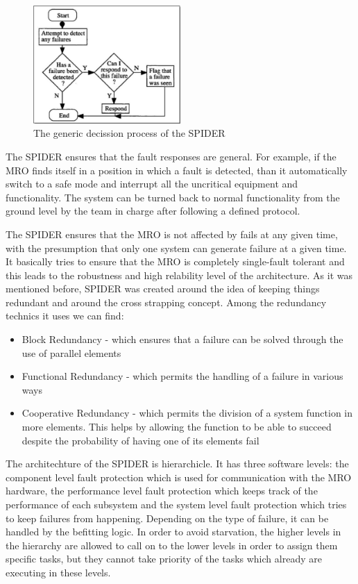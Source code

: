 \begin{figure}[htb]
	\begin{center}
	\includegraphics[width=0.5\textwidth]{img/spider.png}
	\caption{The generic decission process of the SPIDER\cite{surv-nasa-mars}}
	\label{fig:spider}
	\end{center}
\end{figure}


The SPIDER ensures that the fault responses are general. For example, if the MRO
finds itself in a position in which a fault is detected, than it automatically
switch to a safe mode and interrupt all the uncritical equipment and
functionality. The system can be turned back to normal functionality from the
ground level by the team in charge after following a defined protocol.

The SPIDER ensures that the MRO is not affected by fails at any given time, with
the presumption that only one system can generate failure at a given time. It
basically tries to ensure that the MRO is completely single-fault tolerant and
this leads to the robustness and high relability level of the architecture. As
it was mentioned before, SPIDER was created around the idea of keeping things
redundant and around the cross strapping concept. Among the redundancy technics
it uses we can find:
\begin{itemize}
\item Block Redundancy - which ensures that a failure can be solved through the
use of parallel elements
\item Functional Redundancy - which permits the handling of a failure in various
ways
\item Cooperative Redundancy - which permits the division of a system function
in more elements. This helps by allowing the function to be able to succeed despite
the probability of having one of its elements fail
\end{itemize}

The architechture of the SPIDER is hierarchicle. It has three software levels:
the component level fault protection which is used for communication with the
MRO hardware, the performance level fault protection which keeps track of the
performance of each subsystem and the system level fault protection which tries
to keep failures from happening. Depending on the type of failure, it can be
handled by the befitting logic. In order to avoid starvation, the higher levels
in the hierarchy are allowed to call on to the lower levels in order to assign
them specific tasks, but they cannot take priority of the tasks which
already are executing in these levels.

